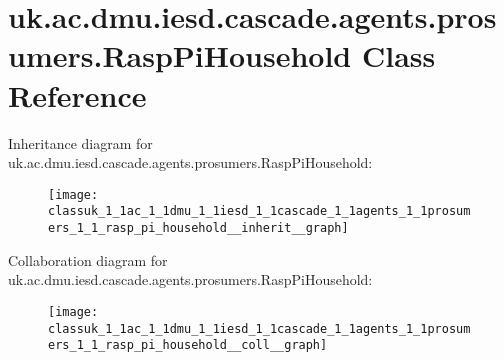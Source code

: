 \hypertarget{classuk_1_1ac_1_1dmu_1_1iesd_1_1cascade_1_1agents_1_1prosumers_1_1_rasp_pi_household}{\section{uk.\-ac.\-dmu.\-iesd.\-cascade.\-agents.\-prosumers.\-Rasp\-Pi\-Household Class Reference}
\label{classuk_1_1ac_1_1dmu_1_1iesd_1_1cascade_1_1agents_1_1prosumers_1_1_rasp_pi_household}
}


Inheritance diagram for uk.\-ac.\-dmu.\-iesd.\-cascade.\-agents.\-prosumers.\-Rasp\-Pi\-Household\-:\nopagebreak
\begin{figure}[H]
\begin{center}
\leavevmode
\texttt{[image: classuk\_1\_1ac\_1\_1dmu\_1\_1iesd\_1\_1cascade\_1\_1agents\_1\_1prosumers\_1\_1\_rasp\_pi\_household\_\_inherit\_\_graph]}
\end{center}
\end{figure}


Collaboration diagram for uk.\-ac.\-dmu.\-iesd.\-cascade.\-agents.\-prosumers.\-Rasp\-Pi\-Household\-:\nopagebreak
\begin{figure}[H]
\begin{center}
\leavevmode
\texttt{[image: classuk\_1\_1ac\_1\_1dmu\_1\_1iesd\_1\_1cascade\_1\_1agents\_1\_1prosumers\_1\_1\_rasp\_pi\_household\_\_coll\_\_graph]}
\end{center}
\end{figure}
